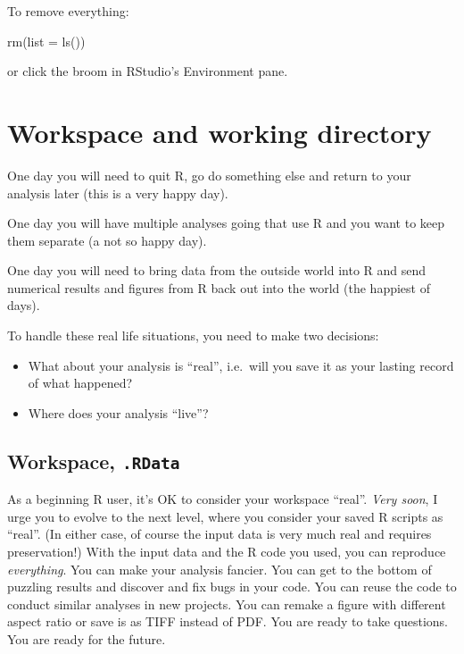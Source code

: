 \documentclass[
]{book}
\newenvironment{Shaded}{\begin{snugshade}}{\end{snugshade}}
\newcommand{\AttributeTok}[1]{\textcolor[rgb]{0.77,0.63,0.00}{#1}}
\newcommand{\FunctionTok}[1]{\textcolor[rgb]{0.00,0.00,0.00}{#1}}
\newcommand{\NormalTok}[1]{#1}
\providecommand{\tightlist}{%
  \setlength{\itemsep}{0pt}\setlength{\parskip}{0pt}}
\begin{document}
To remove everything:

\begin{Shaded}
\begin{Highlighting}[]
\FunctionTok{rm}\NormalTok{(}\AttributeTok{list =} \FunctionTok{ls}\NormalTok{())}
\end{Highlighting}
\end{Shaded}

or click the broom in RStudio's Environment pane.

\hypertarget{workspace-and-working-directory}{%
\section{Workspace and working directory}\label{workspace-and-working-directory}}

One day you will need to quit R, go do something else and return to your analysis later (this is a very happy day).

One day you will have multiple analyses going that use R and you want to keep them separate (a not so happy day).

One day you will need to bring data from the outside world into R and send numerical results and figures from R back out into the world (the happiest of days).

To handle these real life situations, you need to make two decisions:

\begin{itemize}
\tightlist
\item
  What about your analysis is ``real'', i.e.~will you save it as your lasting record of what happened?
\item
  Where does your analysis ``live''?
\end{itemize}

\hypertarget{workspace-.rdata}{%
\subsection{\texorpdfstring{Workspace, \texttt{.RData}}{Workspace, .RData}}\label{workspace-.rdata}}

As a beginning R user, it's OK to consider your workspace ``real''. \emph{Very soon}, I urge you to evolve to the next level, where you consider your saved R scripts as ``real''. (In either case, of course the input data is very much real and requires preservation!) With the input data and the R code you used, you can reproduce
\emph{everything}. You can make your analysis fancier. You can get to the bottom of puzzling results and discover and fix bugs in your code. You can reuse the code to conduct similar analyses in new projects. You can remake a figure with different aspect ratio or save is as TIFF instead of PDF. You are ready to take questions. You are ready for the future.
\end{document}
